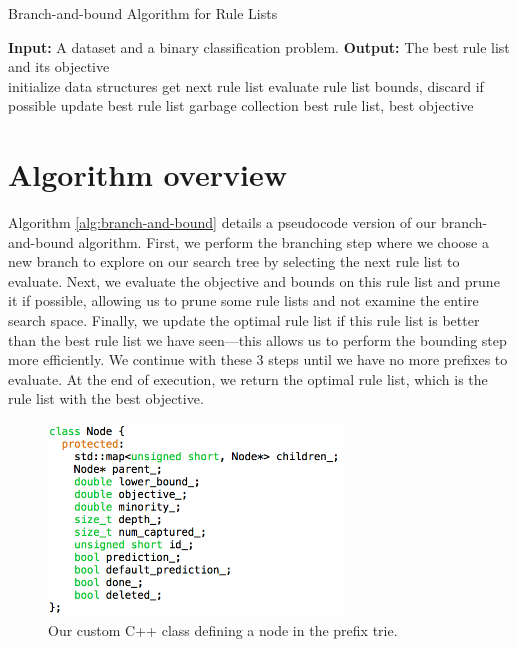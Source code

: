 \begin{algorithm}[t!]
  \caption{Branch-and-bound Algorithm for Rule Lists}
\label{alg:branch-and-bound}
\begin{algorithmic}
\normalsize
\State \textbf{Input:} A dataset and a binary classification problem.
\State \textbf{Output:} The best rule list and its objective\\
\State initialize data structures
	\State get next rule list
	\State evaluate rule list bounds, discard if possible
		\State update best rule list
		\State garbage collection
	\EndIf
\EndWhile
\State \Return best rule list, best objective
\end{algorithmic}
\end{algorithm}

\section{Algorithm overview}
Algorithm \ref{alg:branch-and-bound} details a pseudocode version of our branch-and-bound algorithm.
First, we perform the branching step where we choose a new branch to explore on our search tree by selecting the next rule list to evaluate.
Next, we evaluate the objective and bounds on this rule list and prune it if possible, allowing us to prune some rule lists and not examine the entire search space.
Finally, we update the optimal rule list if this rule list is better than the best rule list we have seen---this allows us to perform the bounding step more efficiently.
We continue with these 3 steps until we have no more prefixes to evaluate.
At the end of execution, we return the optimal rule list, which is the rule list with the best objective.

\begin{figure}[t!]
\begin{center}
\includegraphics[width=0.7\textwidth]{figs/cache_node.png}
\end{center}
\caption{Our custom C++ class defining a node in the prefix trie.}
\label{fig:cache_node}
\end{figure}


